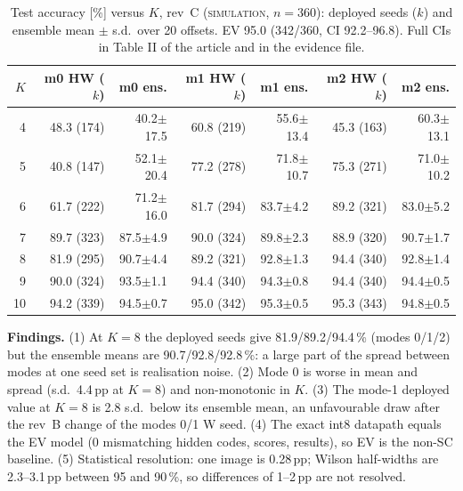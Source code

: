 \documentclass[10pt,a4paper]{article}
\newcommand{\lbl}[1]{\textsc{#1}}          %
\begin{document}
\begin{table}[htbp]
\centering\small
\caption{Test accuracy [\%] versus $K$, rev~C (\lbl{simulation}, $n=360$):
deployed seeds ($k$) and ensemble mean $\pm$ s.d.\ over 20 offsets. EV
95.0 (342/360, CI 92.2--96.8). Full CIs in Table II of the article and in the
evidence file.}\label{tab:acc}
\begin{tabular}{@{}r|rr|rr|rr@{}}
\toprule
$K$ & m0 HW ($k$) & m0 ens. & m1 HW ($k$) & m1 ens. & m2 HW ($k$) & m2 ens.\\
\midrule
4 & 48.3 (174) & 40.2$\pm$17.5 & 60.8 (219) & 55.6$\pm$13.4 & 45.3 (163) & 60.3$\pm$13.1\\
5 & 40.8 (147) & 52.1$\pm$20.4 & 77.2 (278) & 71.8$\pm$10.7 & 75.3 (271) & 71.0$\pm$10.2\\
6 & 61.7 (222) & 71.2$\pm$16.0 & 81.7 (294) & 83.7$\pm$4.2 & 89.2 (321) & 83.0$\pm$5.2\\
7 & 89.7 (323) & 87.5$\pm$4.9 & 90.0 (324) & 89.8$\pm$2.3 & 88.9 (320) & 90.7$\pm$1.7\\
8 & 81.9 (295) & 90.7$\pm$4.4 & 89.2 (321) & 92.8$\pm$1.3 & 94.4 (340) & 92.8$\pm$1.4\\
9 & 90.0 (324) & 93.5$\pm$1.1 & 94.4 (340) & 94.3$\pm$0.8 & 94.4 (340) & 94.4$\pm$0.5\\
10 & 94.2 (339) & 94.5$\pm$0.7 & 95.0 (342) & 95.3$\pm$0.5 & 95.3 (343) & 94.8$\pm$0.5\\
\bottomrule
\end{tabular}
\end{table}

\textbf{Findings.} (1) At $K=8$ the deployed seeds give 81.9/89.2/94.4\,\%
(modes 0/1/2) but the ensemble means are 90.7/92.8/92.8\,\%: a large part of
the spread between modes at one seed set is realisation noise. (2) Mode 0 is
worse in mean and spread (s.d.\ 4.4\,pp at $K=8$) and non-monotonic in $K$.
(3) The mode-1 deployed value at $K=8$ is 2.8 s.d.\ below its ensemble mean,
an unfavourable draw after the rev~B change of the modes 0/1 W seed. (4) The
exact int8 datapath equals the EV model (0 mismatching hidden codes, scores,
results), so EV is the non-SC baseline. (5) Statistical resolution: one image
is 0.28\,pp; Wilson half-widths are 2.3--3.1\,pp between 95 and 90\,\%, so
differences of 1--2\,pp are not resolved.
\end{document}
